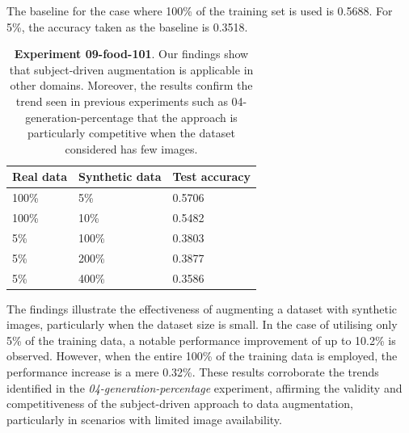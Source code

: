 The baseline for the case where 100\% of the training set is used is 0.5688. For 5\%, the accuracy taken as the baseline is 0.3518.

\begin{table}[ht]
\centering
\begin{tabular}{|l|l|l|}
\hline
\rowcolor[HTML]{BFBFBF} 
\textbf{Real data} & \textbf{Synthetic data} & \textbf{Test accuracy} \\ \hline
100\% & 5\% & 0.5706 \\ \hline
100\% & 10\% & 0.5482 \\ \hline
5\% & 100\% & 0.3803 \\ \hline
5\% & 200\% & 0.3877 \\ \hline
5\% & 400\% & 0.3586 \\ \hline
\end{tabular}
\caption{\textbf{Experiment 09-food-101}. Our findings show that subject-driven augmentation is applicable in other domains. Moreover, the results confirm the trend seen in previous experiments such as 04-generation-percentage that the approach is particularly competitive when the dataset considered has few images.}
\label{table:TableExp09}
\end{table}

The findings illustrate the effectiveness of augmenting a dataset with synthetic images, particularly when the dataset size is small. In the case of utilising only 5\% of the training data, a notable performance improvement of up to 10.2\% is observed. However, when the entire 100\% of the training data is employed, the performance increase is a mere 0.32\%. These results corroborate the trends identified in the \textit{04-generation-percentage} experiment, affirming the validity and competitiveness of the subject-driven approach to data augmentation, particularly in scenarios with limited image availability.

